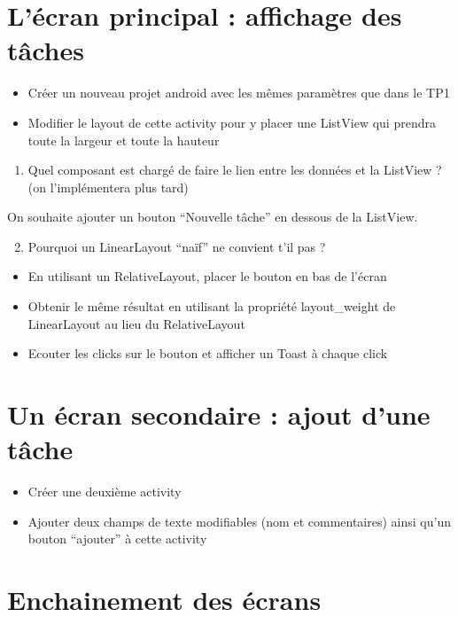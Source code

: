 \documentclass{article}
\begin{document}
\section{L'écran principal : affichage des tâches}
\begin{itemize}
  \item Créer un nouveau projet android avec les mêmes paramètres que dans le
  TP1
  \item Modifier le layout de cette activity pour y placer une ListView qui
  prendra toute la largeur et toute la hauteur
\end{itemize}
\begin{enumerate}
 \setcounter{enumi}{0}
 \item Quel composant est chargé de faire le lien entre les données et la
 ListView ? (on l'implémentera plus tard)
 \end{enumerate}
 On souhaite ajouter un bouton ``Nouvelle tâche'' en dessous de la ListView.
 \begin{enumerate}
 \setcounter{enumi}{1}
\item Pourquoi un LinearLayout ``naïf'' ne convient t'il pas ?
\end{enumerate}
\begin{itemize}
 \item En utilisant un RelativeLayout, placer le bouton en bas de l'écran
  \item Obtenir le même résultat en utilisant la propriété layout\_weight de
  LinearLayout au lieu du RelativeLayout
  \item Ecouter les clicks sur le bouton et afficher un Toast à chaque click
\end{itemize}
\section{Un écran secondaire : ajout d'une tâche}
\begin{itemize}
  \item Créer une deuxième activity
  \item Ajouter deux champs de texte modifiables (nom et commentaires) ainsi
  qu'un bouton ``ajouter'' à cette activity
\end{itemize}
\section{Enchainement des écrans}
\end{document}

